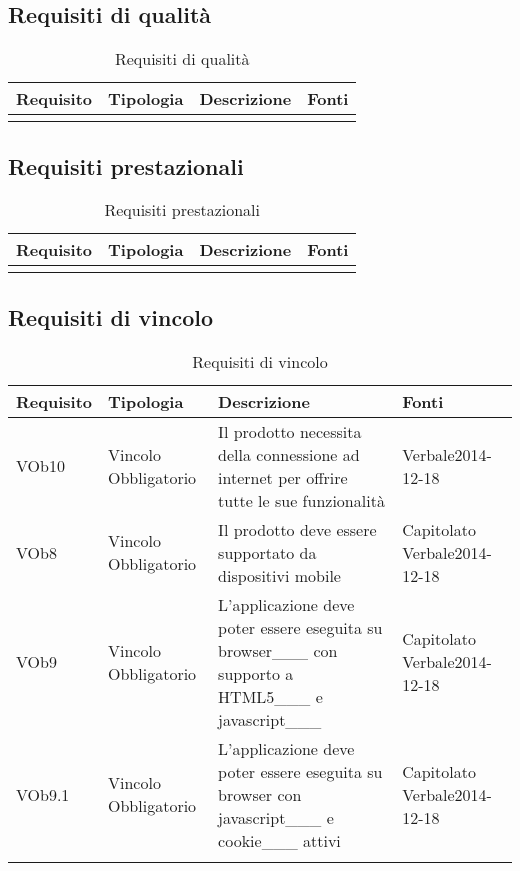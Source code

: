 \subsection{ Requisiti di qualità}
	
\begin{longtable}{|l|p{2.5cm}|p{5cm}|p{3.5cm}|}
\hline
\textbf{Requisito} & \textbf{Tipologia} & \textbf{Descrizione} & \textbf{Fonti} \\
\hline
\caption{Requisiti di qualità}
\end{longtable}
\subsection{ Requisiti prestazionali}
	
\begin{longtable}{|l|p{2.5cm}|p{5cm}|p{3.5cm}|}
\hline
\textbf{Requisito} & \textbf{Tipologia} & \textbf{Descrizione} & \textbf{Fonti} \\
\hline
\caption{Requisiti prestazionali}
\end{longtable}
\subsection{ Requisiti di vincolo}
	
\begin{longtable}{|l|p{2.5cm}|p{5cm}|p{3.5cm}|}
\hline
\textbf{Requisito} & \textbf{Tipologia} & \textbf{Descrizione} & \textbf{Fonti} \\
\hline
VOb10 & Vincolo \linebreak Obbligatorio & Il prodotto necessita della connessione ad internet per offrire tutte le sue funzionalità & Verbale2014-12-18 \linebreak \\
\hline
VOb8 & Vincolo \linebreak Obbligatorio & Il prodotto deve essere supportato da dispositivi mobile & Capitolato \linebreak Verbale2014-12-18 \linebreak \\
\hline
VOb9 & Vincolo \linebreak Obbligatorio & L'applicazione deve poter essere eseguita su browser___ con supporto a HTML5___ e javascript___ & Capitolato \linebreak Verbale2014-12-18 \linebreak \\
\hline
VOb9.1 & Vincolo \linebreak Obbligatorio & L'applicazione deve poter essere eseguita su browser con javascript___ e cookie___ attivi & Capitolato \linebreak  Verbale2014-12-18 \linebreak  \\
\hline
\caption{Requisiti di vincolo}
\end{longtable}
